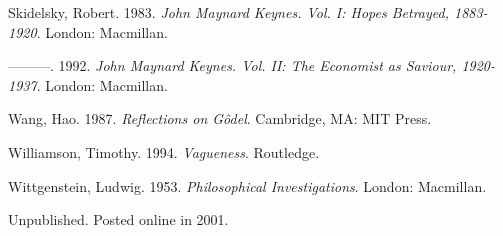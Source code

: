 \documentclass[
  11pt,
  letterpaper,
  DIV=11,
  numbers=noendperiod,
  twoside]{scrartcl}
\newlength{\cslhangindent}
\newenvironment{CSLReferences}[2] %
 {\begin{list}{}{%
  \setlength{\itemindent}{0pt}
  \setlength{\leftmargin}{0pt}
  \setlength{\parsep}{0pt}
  \ifodd #1
   \setlength{\leftmargin}{\cslhangindent}
   \setlength{\itemindent}{-1\cslhangindent}
  \fi
  \setlength{\itemsep}{#2\baselineskip}}}
 {\end{list}}
\begin{document}
\begin{CSLReferences}{1}{0}
Skidelsky, Robert. 1983. \emph{John Maynard Keynes. Vol. I: Hopes
Betrayed, 1883-1920}. London: Macmillan.

---------. 1992. \emph{John Maynard Keynes. Vol. II: The Economist as
Saviour, 1920-1937}. London: Macmillan.

Wang, Hao. 1987. \emph{Reflections on Gôdel}. Cambridge, MA: MIT Press.

Williamson, Timothy. 1994. \emph{{Vagueness}}. Routledge.

Wittgenstein, Ludwig. 1953. \emph{Philosophical Investigations}. London:
Macmillan.

\end{CSLReferences}



\noindent Unpublished. Posted online in 2001.
\end{document}
